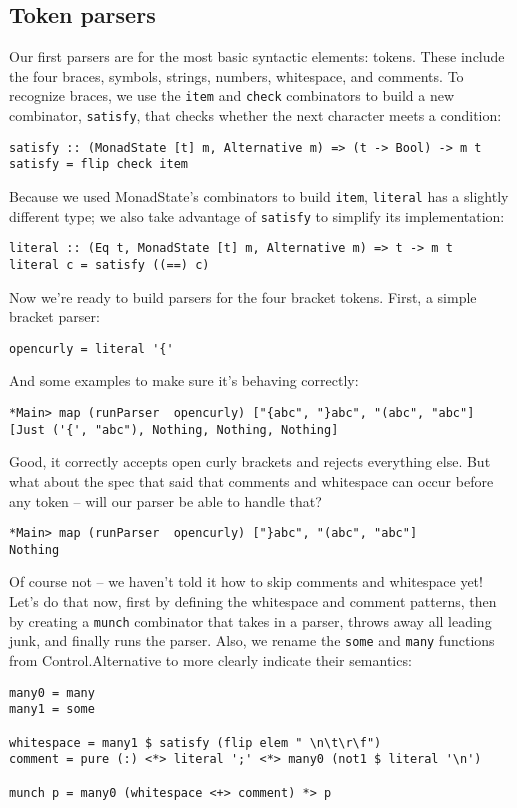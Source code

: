 \documentclass{tmr}
\begin{document}
\subsection{Token parsers}
Our first parsers are for the most basic syntactic elements:  tokens.
These include the four braces, symbols, strings, numbers, whitespace, and comments.
To recognize braces, we use the \verb+item+ and \verb+check+ 
combinators to build a new combinator, \verb+satisfy+, that checks whether 
the next character meets a condition:
\begin{verbatim}
satisfy :: (MonadState [t] m, Alternative m) => (t -> Bool) -> m t
satisfy = flip check item
\end{verbatim}

Because we used MonadState's combinators to build \verb+item+, \verb+literal+ 
has a slightly different type; we also take advantage of \verb+satisfy+ to 
simplify its implementation:
\begin{verbatim}
literal :: (Eq t, MonadState [t] m, Alternative m) => t -> m t
literal c = satisfy ((==) c)
\end{verbatim}

Now we're ready to build parsers for the four bracket tokens.  
First, a simple bracket parser:
\begin{verbatim}
opencurly = literal '{'
\end{verbatim}

And some examples to make sure it's behaving correctly: 
\begin{verbatim}
*Main> map (runParser  opencurly) ["{abc", "}abc", "(abc", "abc"]
[Just ('{', "abc"), Nothing, Nothing, Nothing]
\end{verbatim}

Good, it correctly accepts open curly brackets and rejects everything else.
But what about the spec that said that comments and whitespace can occur 
before any token -- will our parser be able to handle that?
\begin{verbatim}
*Main> map (runParser  opencurly) ["}abc", "(abc", "abc"]
Nothing
\end{verbatim}

Of course not -- we haven't told it how to skip comments and whitespace yet!
Let's do that now, first by defining the whitespace and comment patterns, then
by creating a \verb+munch+ combinator that takes in a parser, 
throws away all leading junk, and finally runs the parser.  Also, we rename
the \verb+some+ and \verb+many+ functions from Control.Alternative to more
clearly indicate their semantics:
\begin{verbatim}
many0 = many
many1 = some

whitespace = many1 $ satisfy (flip elem " \n\t\r\f")
comment = pure (:) <*> literal ';' <*> many0 (not1 $ literal '\n')

munch p = many0 (whitespace <+> comment) *> p
\end{verbatim}
\end{document}
